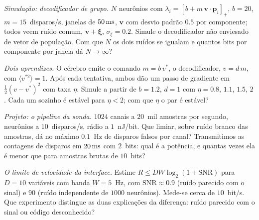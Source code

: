 \begin{exercise}[\lvlB]
\label{ex:17:4}
\emph{Simulação: decodificador de grupo.} $N$ neurônios com $\lambda_i=[b+m\,\mathbf v\cdot\mathbf p_i]_+$, $b=20$, $m=15$~disparos/s, janelas de $50\,\text{ms}$, $\mathbf v$ com desvio padrão $0.5$ por componente; todos veem ruído comum, $\mathbf v+\boldsymbol\xi$, $\sigma_\xi=0.2$. Simule o decodificador não enviesado de vetor de população. Com que $N$ os dois ruídos se igualam e quantos bits por componente por janela dá $N\to\infty$?
\end{exercise}

\begin{exercise}[\lvlB]
\label{ex:17:5}
\emph{Dois aprendizes.} O cérebro emite o comando $m=b\,v^*$, o decodificador, $v=d\,m$, com $\langle v^{*2}\rangle=1$. Após cada tentativa, ambos dão um passo de gradiente em $\tfrac12(v-v^*)^2$ com taxa $\eta$. Simule a partir de $b=1.2$, $d=1$ com $\eta=0.8$, $1.1$, $1.5$, $2$. Cada um sozinho é estável para $\eta<2$; com que $\eta$ o par é estável?
\end{exercise}

\begin{exercise}[\lvlB]
\label{ex:17:6}
\emph{Projeto: o pipeline da sonda.} $1024$ canais a $20$~mil amostras por segundo, neurônios a $10$~disparos/s, rádio a $1$~nJ/bit. Que limiar, sobre ruído branco das amostras, dá no máximo $0.1$~Hz de disparos falsos por canal? Transmitimos as contagens de disparos em $20\,\text{ms}$ com $2$~bits: qual é a potência, e quantas vezes ela é menor que para amostras brutas de $10$~bits?
\end{exercise}

\begin{exercise}[\lvlC]
\label{ex:17:7}
\emph{O limite de velocidade da interface.} Estime $R\le DW\log_2(1+\text{SNR})$ para $D=10$ variáveis com banda $W=5$~Hz, com $\text{SNR}\approx0.9$ (ruído parecido com o sinal) e $90$ (ruído independente de $1000$ neurônios). Mede-se cerca de $10$~bit/s. Que experimento distingue as duas explicações da diferença: ruído parecido com o sinal ou código desconhecido?
\end{exercise}
